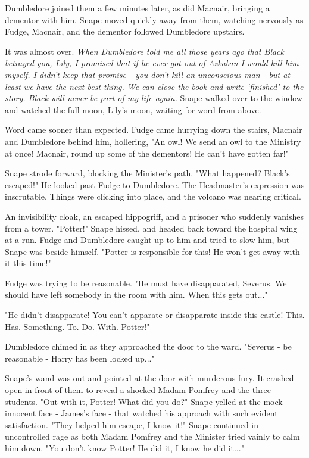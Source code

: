 Dumbledore joined them a few minutes later, as did Macnair, bringing a dementor with him. Snape moved quickly away from them, watching nervously as Fudge, Macnair, and the dementor followed Dumbledore upstairs.

It was almost over. \emph{When Dumbledore told me all those years ago that Black betrayed you, Lily, I promised that if he ever got out of Azkaban I would kill him myself. I didn't keep that promise - you don't kill an unconscious man - but at least we have the next best thing. We can close the book and write `finished' to the story. Black will never be part of my life again.} Snape walked over to the window and watched the full moon, Lily's moon, waiting for word from above.

Word came sooner than expected. Fudge came hurrying down the stairs, Macnair and Dumbledore behind him, hollering, "An owl! We send an owl to the Ministry at once! Macnair, round up some of the dementors! He can't have gotten far!"

Snape strode forward, blocking the Minister's path. "What happened? Black's escaped!" He looked past Fudge to Dumbledore. The Headmaster's expression was inscrutable. Things were clicking into place, and the volcano was nearing critical.

An invisibility cloak, an escaped hippogriff, and a prisoner who suddenly vanishes from a tower. "Potter!" Snape hissed, and headed back toward the hospital wing at a run. Fudge and Dumbledore caught up to him and tried to slow him, but Snape was beside himself. "Potter is responsible for this! He won't get away with it this time!"

Fudge was trying to be reasonable. "He must have disapparated, Severus. We should have left somebody in the room with him. When this gets out..."

"He didn't disapparate! You can't apparate or disapparate inside this castle! This. Has. Something. To. Do. With. Potter!"

Dumbledore chimed in as they approached the door to the ward. "Severus - be reasonable - Harry has been locked up..."

Snape's wand was out and pointed at the door with murderous fury. It crashed open in front of them to reveal a shocked Madam Pomfrey and the three students. "Out with it, Potter! What did you do?" Snape yelled at the mock-innocent face - James's face - that watched his approach with such evident satisfaction. "They helped him escape, I know it!" Snape continued in uncontrolled rage as both Madam Pomfrey and the Minister tried vainly to calm him down. "You don't know Potter! He did it, I know he did it..."

